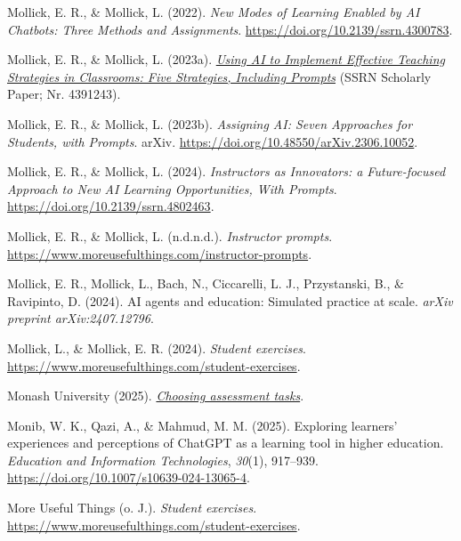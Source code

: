 \documentclass[
  ngerman,
  letterpaper,
  DIV=11]{scrreprt}
\newlength{\cslhangindent}
\newenvironment{CSLReferences}[2] %
 {\begin{list}{}{%
  \setlength{\itemindent}{0pt}
  \setlength{\leftmargin}{0pt}
  \setlength{\parsep}{0pt}
  \ifodd #1
   \setlength{\leftmargin}{\cslhangindent}
   \setlength{\itemindent}{-1\cslhangindent}
  \fi
  \setlength{\itemsep}{#2\baselineskip}}}
 {\end{list}}
\begin{document}
\begin{CSLReferences}{1}{0}
Mollick, E. R., \& Mollick, L. (2022). \emph{New Modes of Learning
Enabled by AI Chatbots: Three Methods and Assignments}.
\url{https://doi.org/10.2139/ssrn.4300783}.

Mollick, E. R., \& Mollick, L. (2023a).
\emph{\href{https://papers.ssrn.com/abstract=4391243}{Using AI to
Implement Effective Teaching Strategies in Classrooms: Five Strategies,
Including Prompts}} (SSRN Scholarly Paper; Nr. 4391243).

Mollick, E. R., \& Mollick, L. (2023b). \emph{Assigning AI: Seven
Approaches for Students, with Prompts}. arXiv.
\url{https://doi.org/10.48550/arXiv.2306.10052}.

Mollick, E. R., \& Mollick, L. (2024). \emph{Instructors as Innovators:
a Future-focused Approach to New AI Learning Opportunities, With
Prompts}. \url{https://doi.org/10.2139/ssrn.4802463}.

Mollick, E. R., \& Mollick, L. (n.d.n.d.). \emph{Instructor prompts}.
\url{https://www.moreusefulthings.com/instructor-prompts}.

Mollick, E. R., Mollick, L., Bach, N., Ciccarelli, L. J., Przystanski,
B., \& Ravipinto, D. (2024). AI agents and education: Simulated practice
at scale. \emph{arXiv preprint arXiv:2407.12796}.

Mollick, L., \& Mollick, E. R. (2024). \emph{Student exercises}.
\url{https://www.moreusefulthings.com/student-exercises}.

Monash University (2025).
\emph{\href{https://www.monash.edu/learning-teaching/teachhq/Assessment/academic-integrity/how-to/design-assessment-for-academic-integrity}{Choosing
assessment tasks}}.

Monib, W. K., Qazi, A., \& Mahmud, M. M. (2025). Exploring learners'
experiences and perceptions of ChatGPT as a learning tool in higher
education. \emph{Education and Information Technologies}, \emph{30}(1),
917--939. \url{https://doi.org/10.1007/s10639-024-13065-4}.

More Useful Things (o. J.). \emph{Student exercises}.
\url{https://www.moreusefulthings.com/student-exercises}.


\end{CSLReferences}
\end{document}
